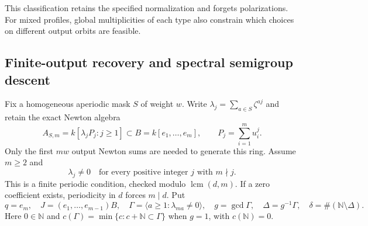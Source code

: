 \documentclass[10pt,fleqn]{article}
\numberwithin{equation}{section}
\begin{document}
This classification retains the specified normalization and forgets
polarizations.  For mixed profiles, global multiplicities of each type
also constrain which choices on different output orbits are feasible.

\subsection{Finite-output recovery and spectral semigroup descent}
\label{r21:cond:semigroup-route}

Fix a homogeneous aperiodic mask $S$ of weight $w$.  Write
$\lambda_j=\sum_{a\in S}\zeta^{aj}$ and retain the exact Newton algebra
\begin{equation}\label{v6:cond:newton-algebra}
 A_{S,m}=k[\lambda_jP_j:j\ge1]\subset B=k[e_1,\ldots,e_m],
 \qquad P_j=\sum_{i=1}^m u_i^j.
\end{equation}
Only the first $mw$ output Newton sums are needed to generate this ring.
Assume $m\ge2$ and
\begin{equation}\label{v7:cond:spectral-hypothesis}
 \lambda_j\ne0\quad\text{for every positive integer }j\text{ with }m\nmid j.
\end{equation}
This is a finite periodic condition, checked modulo $\operatorname{lcm}(d,m)$.
If a zero coefficient exists, periodicity in $d$ forces $m\mid d$.
Put
\begin{equation}\label{v7:cond:general-semigroup}
 q=e_m,\quad J=(e_1,\ldots,e_{m-1})B,\quad
 \Gamma=\langle a\ge1:\lambda_{ma}\ne0\rangle,\quad
 g=\gcd\Gamma,\quad\Delta=g^{-1}\Gamma,\quad
 \delta=\#(\mathbb N\setminus\Delta).
\end{equation}
Here $0\in\mathbb N$ and $c(\Gamma)=\min\{c:c+\mathbb N\subset\Gamma\}$
when $g=1$, with $c(\mathbb N)=0$.
\end{document}
